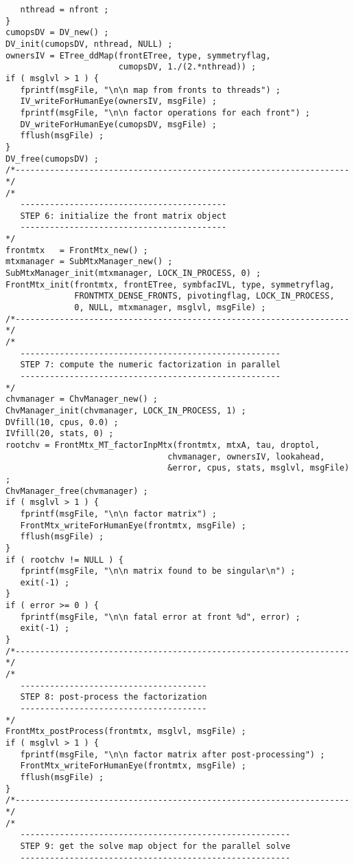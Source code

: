 \begin{verbatim}
   nthread = nfront ;
}
cumopsDV = DV_new() ;
DV_init(cumopsDV, nthread, NULL) ;
ownersIV = ETree_ddMap(frontETree, type, symmetryflag,
                       cumopsDV, 1./(2.*nthread)) ;
if ( msglvl > 1 ) {
   fprintf(msgFile, "\n\n map from fronts to threads") ;
   IV_writeForHumanEye(ownersIV, msgFile) ;
   fprintf(msgFile, "\n\n factor operations for each front") ;
   DV_writeForHumanEye(cumopsDV, msgFile) ;
   fflush(msgFile) ;
}
DV_free(cumopsDV) ;
/*--------------------------------------------------------------------*/
/*
   ------------------------------------------
   STEP 6: initialize the front matrix object
   ------------------------------------------
*/
frontmtx   = FrontMtx_new() ;
mtxmanager = SubMtxManager_new() ;
SubMtxManager_init(mtxmanager, LOCK_IN_PROCESS, 0) ;
FrontMtx_init(frontmtx, frontETree, symbfacIVL, type, symmetryflag, 
              FRONTMTX_DENSE_FRONTS, pivotingflag, LOCK_IN_PROCESS, 
              0, NULL, mtxmanager, msglvl, msgFile) ;
/*--------------------------------------------------------------------*/
/*
   -----------------------------------------------------
   STEP 7: compute the numeric factorization in parallel
   -----------------------------------------------------
*/
chvmanager = ChvManager_new() ;
ChvManager_init(chvmanager, LOCK_IN_PROCESS, 1) ;
DVfill(10, cpus, 0.0) ;
IVfill(20, stats, 0) ;
rootchv = FrontMtx_MT_factorInpMtx(frontmtx, mtxA, tau, droptol,
                                 chvmanager, ownersIV, lookahead, 
                                 &error, cpus, stats, msglvl, msgFile) ;
ChvManager_free(chvmanager) ;
if ( msglvl > 1 ) {
   fprintf(msgFile, "\n\n factor matrix") ;
   FrontMtx_writeForHumanEye(frontmtx, msgFile) ;
   fflush(msgFile) ;
}
if ( rootchv != NULL ) {
   fprintf(msgFile, "\n\n matrix found to be singular\n") ;
   exit(-1) ;
}
if ( error >= 0 ) {
   fprintf(msgFile, "\n\n fatal error at front %d", error) ;
   exit(-1) ;
}
/*--------------------------------------------------------------------*/
/*
   --------------------------------------
   STEP 8: post-process the factorization
   --------------------------------------
*/
FrontMtx_postProcess(frontmtx, msglvl, msgFile) ;
if ( msglvl > 1 ) {
   fprintf(msgFile, "\n\n factor matrix after post-processing") ;
   FrontMtx_writeForHumanEye(frontmtx, msgFile) ;
   fflush(msgFile) ;
}
/*--------------------------------------------------------------------*/
/*
   -------------------------------------------------------
   STEP 9: get the solve map object for the parallel solve
   -------------------------------------------------------

\end{verbatim}
